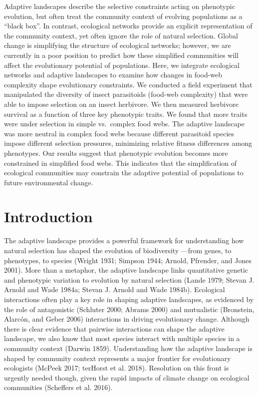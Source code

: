 \documentclass[11pt,]{article}
\begin{document}
Adaptive landscapes describe the selective constraints acting on
phenotypic evolution, but often treat the community context of evolving
populations as a ``black box''. In contrast, ecological networks provide
an explicit representation of the community context, yet often ignore
the role of natural selection. Global change is simplifying the
structure of ecological networks; however, we are currently in a poor
position to predict how these simplified communities will affect the
evolutionary potential of populations. Here, we integrate ecological
networks and adaptive landscapes to examine how changes in food-web
complexity shape evolutionary constraints. We conducted a field
experiment that manipulated the diversity of insect parasitoids
(food-web complexity) that were able to impose selection on an insect
herbivore. We then measured herbivore survival as a function of three
key phenotypic traits. We found that more traits were under selection in
simple vs.~complex food webs. The adaptive landscape was more neutral in
complex food webs because different parasitoid species impose different
selection pressures, minimizing relative fitness differences among
phenotypes. Our results suggest that phenotypic evolution becomes more
constrained in simplified food webs. This indicates that the
simplification of ecological communities may constrain the adaptive
potential of populations to future environmental change.

\newpage

\section{Introduction}\label{introduction}

The adaptive landscape provides a powerful framework for understanding
how natural selection has shaped the evolution of biodiversity ---from
genes, to phenotypes, to species (Wright 1931; Simpson 1944; Arnold,
Pfrender, and Jones 2001). More than a metaphor, the adaptive landscape
links quantitative genetic and phenotypic variation to evolution by
natural selection (Lande 1979; Stevan J. Arnold and Wade 1984a; Stevan
J. Arnold and Wade 1984b). Ecological interactions often play a key role
in shaping adaptive landscapes, as evidenced by the role of antagonistic
(Schluter 2000; Abrams 2000) and mutualistic (Bronstein, Alarcón, and
Geber 2006) interactions in driving evolutionary change. Although there
is clear evidence that pairwise interactions can shape the adaptive
landscape, we also know that most species interact with multiple species
in a community context (Darwin 1859). Understanding how the adaptive
landscape is shaped by community context represents a major frontier for
evolutionary ecologists (McPeek 2017; terHorst et al. 2018). Resolution
on this front is urgently needed though, given the rapid impacts of
climate change on ecological communities (Scheffers et al. 2016).
\end{document}
